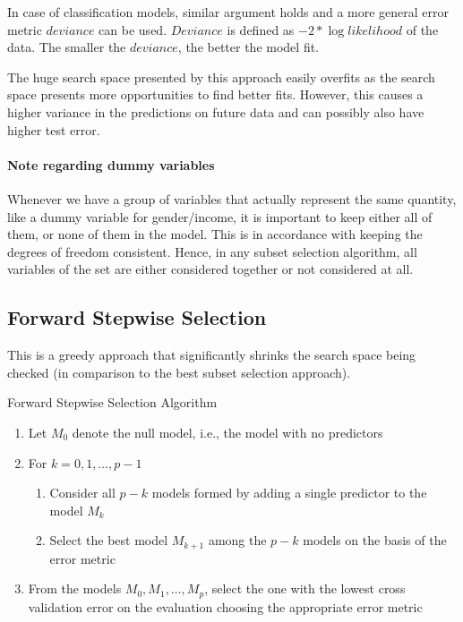 \documentclass[../statistical_learning_notes.tex]{subfiles}
\begin{document}
    In case of classification models, similar argument holds and a more general error metric $deviance$ can be used. $Deviance$ is defined as $-2 * \log likelihood$ of the data. The smaller the $deviance$, the better the model fit.\newline

    The huge search space presented by this approach easily overfits as the search space presents more opportunities to find better fits. However, this causes a higher variance in the predictions on future data and can possibly also have higher test error.

    \paragraph{Note regarding dummy variables} Whenever we have a group of variables that actually represent the same quantity, like a dummy variable for gender/income, it is important to keep either all of them, or none of them in the model. This is in accordance with keeping the degrees of freedom consistent. Hence, in any subset selection algorithm, all variables of the set are either considered together or not considered at all.

    
    \subsection{Forward Stepwise Selection}
    This is a greedy approach that significantly shrinks the search space being checked (in comparison to the best subset selection approach).

    Forward Stepwise Selection Algorithm
    \begin{enumerate}
        \item Let $M_{0}$ denote the null model, i.e., the model with no predictors
        \item For $k = 0, 1, \ldots, p - 1$
        \begin{enumerate}
            \item Consider all $p - k$ models formed by adding a single predictor to the model $M_{k}$
            \item Select the best model $M_{k+1}$ among the $p - k$ models on the basis of the error metric
        \end{enumerate}
        \item From the models $M_{0}, M_{1}, \ldots, M_{p}$, select the one with the lowest cross validation error on the evaluation choosing the appropriate error metric
    \end{enumerate}
\end{document}

